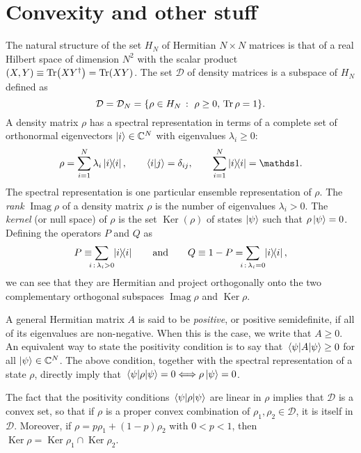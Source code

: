 \documentclass[12pt]{report}
\DeclareMathOperator{\Ker}{Ker}
\DeclareMathOperator{\Imag}{Imag}
\begin{document}
\section{Convexity and other stuff}
The natural structure of the set $H_N$ of Hermitian $N\times N$ matrices is that of a real Hilbert space of dimension $N^2$ with the scalar product
$(X, Y) \equiv \Tr(XY^\dagger) = \Tr(XY)$.
The set $\mathcal D$ of density matrices is a subspace of $H_N$ defined as
\begin{equation}
	\mathcal D = \mathcal D_N = \{ \rho \in H_N \,:\,\, \rho \ge 0, \,\Tr\rho=1 \}.
\end{equation}
A density matrix $\rho$ has a spectral representation in terms of a complete set of orthonormal eigenvectors $\ket i \in \mathbb C^N$ with eigenvalues $\lambda_i \ge 0$:
\begin{equation}
	\rho = \sum_{i=1}^N \lambda_i \ketbra{i}{i},
	\qquad
	\braket{i}{j} = \delta_{ij},
	\qquad
	\sum_{i=1}^N \ketbra{i}{i} = \mathds1.
\end{equation}
The spectral representation is one particular ensemble representation of $\rho$.
The \emph{rank} $\Imag\rho$ of a density matrix $\rho$ is the number of eigenvalues $\lambda_i > 0$.
The \emph{kernel} (or null space) of $\rho$ is the set $\Ker(\rho)$ of states $\ket\psi$ such that $\rho\ket\psi = 0$.
Defining the operators $P$ and $Q$ as
\begin{equation}
	P \equiv \sum_{\mathclap{i\,:\,\lambda_i > 0}}\,\, \ketbra{i}{i}
	\qquad\text{and}\qquad
	Q \equiv 1 - P = \sum_{\mathclap{i\,:\,\lambda_i=0}}\,\, \ketbra{i}{i},
\end{equation}
we can see that they are Hermitian and project orthogonally onto the two complementary orthogonal subspaces $\Imag\rho$ and $\Ker\rho$.

A general Hermitian matrix $A$ is said to be \emph{positive}, or positive semidefinite,
if all of its eigenvalues are non-negative.
When this is the case, we write that $A\ge0$.
An equivalent way to state the positivity condition is to say that
$\mel{\psi}{A}{\psi} \ge 0$ for all $\ket\psi\in \mathbb C^N$.
The above condition, together with the spectral representation of a state $\rho$,
directly imply that $\mel{\psi}{\rho}{\psi} = 0 \Longleftrightarrow \rho\ket\psi=0$.

The fact that the positivity conditions $\mel\psi\rho\psi$ are linear in $\rho$ implies that $\mathcal D$ is a convex set, so that if $\rho$ is a proper convex combination of $\rho_1, \rho_2\in \mathcal D$, it is itself in $\mathcal D$.
Moreover, if $\rho=p \rho_1 + (1-p)\rho_2$ with $0<p<1$, then
$\Ker\rho = \Ker\rho_1 \cap \Ker\rho_2$.
\end{document}
